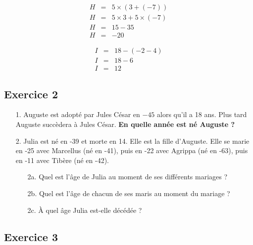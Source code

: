 \documentclass[12pt]{article}
\begin{document}
\begin{multicols}{3}
\vspace{-0.5cm}

  \begin{eqnarray*}
    H &=& 5 \times (3 + (-7))        \\
    H &=& 5 \times 3 + 5 \times (-7) \\
    H &=& 15 - 35  \\
    H &=& -20  
  \end{eqnarray*}

\vspace{-0.5cm}

  \begin{eqnarray*}
    I &=& 18 - (-2 - 4) \\
    I &=& 18 - 6       \\
    I &=& 12
  \end{eqnarray*}

\end{multicols}

\subsection*{Exercice 2}


\begin{enumerate}
\item[1.] Auguste est adopté par Jules César en $-45$ alors qu'il a 18 ans. Plus tard Auguste succèdera à Jules César. \textbf{En quelle année est né Auguste ?}

\item[2.] Julia est né en -39 et morte en 14. Elle est la fille d'Auguste. Elle se marie en -25 avec Marcellus (né en -41), puis en -22 avec Agrippa (né en -63), puis en -11 avec Tibère (né en -42).

  \begin{enumerate}
  \item[2a.] Quel est l'âge de Julia au moment de ses différents mariages ?
  \item[2b.] Quel est l'âge de chacun de ses maris au moment du mariage ?
  \item[2c.] À quel âge Julia est-elle décédée ?
  \end{enumerate}
\end{enumerate}



\subsection*{Exercice 3}
\end{document}
